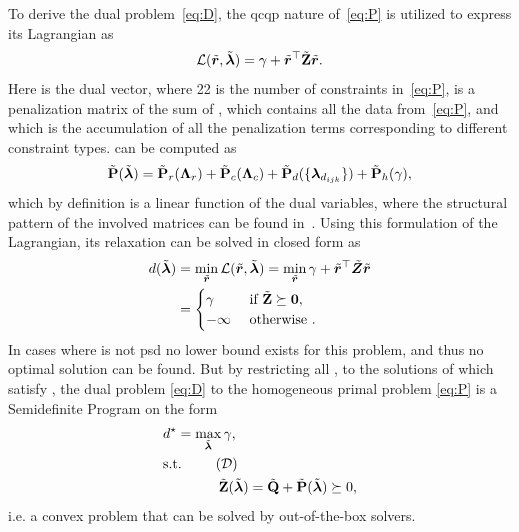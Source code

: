 To derive the dual problem~\ref{eq:D}, the \gls{qcqp} nature of~\ref{eq:P} is utilized to express its Lagrangian as
%
\begin{equation}\label{eq:lagrangian-p}
	\mathcal{L}(\tilde{\bm{r}}, \tilde{\bm{\lambda}}) = \gamma + \tilde{\bm{r}}^\top  \tilde{\bm{\mathrm{Z}}}  \tilde{\bm{r}}.
\end{equation}
Here  is the dual vector, where \num{22} is the number of constraints in~\ref{eq:P},  is a penalization matrix of the sum of , which contains all the data from~\ref{eq:P}, and  which is the accumulation of all the penalization terms corresponding to different constraint types.  can be computed as
%
\begin{equation}\label{eq:penalty-matrix}
	\tilde{\bm{\mathrm{P}}}(\tilde{\bm{\lambda}}) = \tilde{\bm{\mathrm{P}}}_r(\bm{\mathrm{\Lambda}}_r) + \tilde{\bm{\mathrm{P}}}_c(\bm{\mathrm{\Lambda}}_c) + \tilde{\bm{\mathrm{P}}}_d(\{ \bm{\lambda}_{d_{ijk}} \}) + \tilde{\bm{\mathrm{P}}}_h(\gamma),
\end{equation}
which by definition is a linear function of the dual variables, where the structural pattern of the involved matrices can be found in~\cite{convex-global-3d-registration-with-lagrangian-duality}. Using this formulation of the Lagrangian, its relaxation can be solved in closed form as 
\begin{align}
	d(\tilde{\bm{\lambda}})&=\min_{\tilde{\bm{r}}}\mathcal{L}(\tilde{\bm{r}},\tilde{\bm{\lambda}})=\min_{\tilde{\bm{r}}} \gamma + \tilde{\bm{r}}^\top \tilde{\bm{Z}} \tilde{\bm{r}} \\
	&= \begin{cases}
		\gamma & \text{ if } \tilde{\bm{\mathrm{Z}}} \succeq \bm{0}, \\
		-\infty & \text{ otherwise }.
	\end{cases}
\end{align}
In cases where  is not \gls{psd} no lower bound exists for this problem, and thus no optimal solution can be found. But by restricting all \mvar{\tilde{\vec{\lambda}}}, to the solutions of  which satisfy , the dual problem \ref{eq:D} to the homogeneous primal problem \ref{eq:P} is a Semidefinite Program on the form 
%
\begin{align*}
	& d^\star = \max_{\tilde{\vec{\lambda}}} \gamma, \\
	& \text{s.t. }         \tag{$\mathcal{D}$} \label{eq:D}\\ 
	&\qquad \qquad \tilde{\mat{Z}}(\tilde{\vec{\lambda}})=\tilde{\mat{Q}} + \tilde{\mat{P}}(\tilde{\vec{\lambda}}) \succeq 0, 
\end{align*}
i.e. a convex problem that can be solved by out-of-the-box solvers. \medskip

